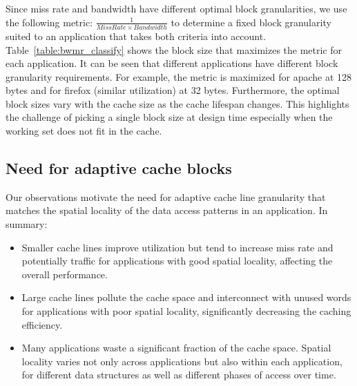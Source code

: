 


Since miss rate and bandwidth have different optimal block
granularities, we use the following metric: $\frac{1}{Miss Rate \times
  Bandwidth}$ to determine a fixed block granularity suited to an
application that takes both criteria into account.
Table~\ref{table:bwmr_classify} shows the block size that maximizes
the metric for each application.  It can be seen that different
applications have different block granularity requirements.  For
example, the metric is maximized for apache at 128 bytes and for
firefox (similar utilization) at 32 bytes.  Furthermore, the optimal
block sizes vary with the cache size as the cache lifespan
changes. This highlights the challenge of picking a single block size
at design time especially when the working set does not fit in the
cache.

\subsection{Need for adaptive cache blocks}
Our observations motivate the need for adaptive cache line
granularity that matches the spatial locality of the data access patterns
in an application. In summary:
\begin{itemize}
  \item  Smaller cache lines improve utilization but tend to increase
    miss rate and potentially traffic for applications with good
    spatial locality, affecting the overall performance.
  \item Large cache lines pollute the cache space and interconnect
    with unused words for applications with poor spatial locality, 
   significantly decreasing the caching efficiency.
  \item Many applications waste a significant fraction of the cache
  space. Spatial locality varies not only across applications but also
  within each application, for different data structures as well as 
  different phases of access over time.   

\end{itemize}


